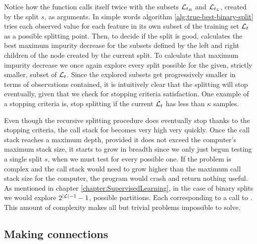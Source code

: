 Notice how the function \TrueBestSplit calls itself twice with the subsets
$\mathcal{L}_{t_R}$ and $\mathcal{L}_{t_L}$, created by the split $s$, as arguments. In simple words
algorithm \ref{alg:true-best-binary-split} tries each observed value for each
feature in its own subset of the training set $\mathcal{L}_t$ as a possible splitting
point. Then, to decide if the split is good, calculates the best maximum
impurity decrease for the subsets defined by the left and right children of the
node created by the current split. To calculate that maximum impurity decrease
we once again explore every split possible for the given, strictly smaller,
subset of $\mathcal{L}_t$. Since the explored subsets get progressively smaller in terms
of observations contained, it is intuitively clear that the splitting will stop
eventually, given that we check for stopping criteria satisfaction. One example
of a stopping criteria is, stop splitting if the current $\mathcal{L}_t$ has less
than $\kappa$ samples.

Even though the recursive splitting procedure does eventually stop thanks to the
stopping criteria, the call stack for \TrueBestSplit becomes very high very
quickly. Once the call stack reaches a maximum depth, provided it does not
exceed the computer's maximum stack size, it starts to grow in breadth since we
only just begun testing a single split $s$, when we must test for every possible
one. If the problem is complex and the call stack would need to grow higher than
the maximum call stack size for the computer, the program would crash and return
nothing useful. As mentioned in chapter \ref{chapter:SupervisedLearning}, in the
case of binary splits we would explore $2^{|\mathcal{L}| -1}-1$, possible partitions.
Each corresponding to a call to \TrueBestSplit. This amount of complexity makes
all but trivial problems impossible to solve. 

\subsection{Making connections}

